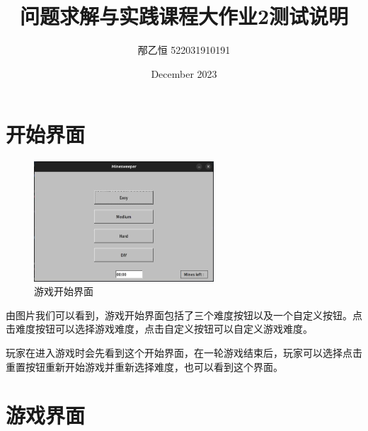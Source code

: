 \documentclass{article}
\title{问题求解与实践课程大作业2测试说明}
\author{邴乙恒 522031910191}
\date{December 2023}
\begin{document}
\begin{CJK}{UTF8}{gbsn}

\maketitle

\section{开始界面}

\begin{figure}[h]
    \centering
    \includegraphics[width=0.6\textwidth]{test1.jpg}
    \caption{游戏开始界面}
    \label{fig:example1}
\end{figure}

由图片我们可以看到，游戏开始界面包括了三个难度按钮以及一个自定义按钮。点击难度按钮可以选择游戏难度，点击自定义按钮可以自定义游戏难度。

玩家在进入游戏时会先看到这个开始界面，在一轮游戏结束后，玩家可以选择点击重置按钮重新开始游戏并重新选择难度，也可以看到这个界面。

\section{游戏界面}


\end{CJK}
\end{document}
